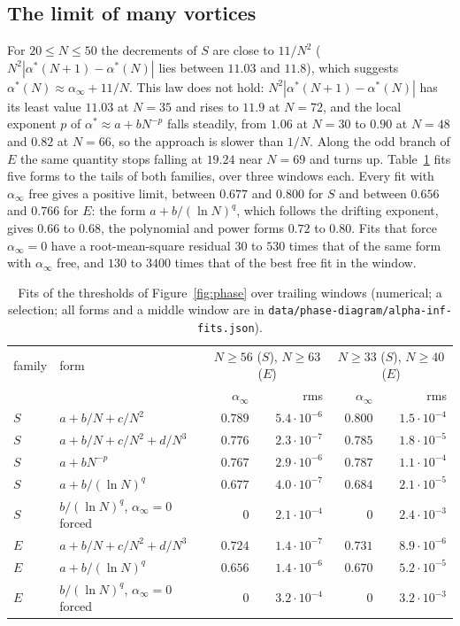 \documentclass[11pt]{article}
\theoremstyle{definition}
\begin{document}
\subsection{The limit of many vortices}

For $20 \le N \le 50$ the decrements of $S$ are close to $11/N^2$ ($N^2|\alpha^*(N + 1) - \alpha^*(N)|$ lies between $11.03$ and $11.8$), which suggests $\alpha^*(N) \approx \alpha_\infty + 11/N$. This law does not hold: $N^2|\alpha^*(N + 1) - \alpha^*(N)|$ has its least value $11.03$ at $N = 35$ and rises to $11.9$ at $N = 72$, and the local exponent $p$ of $\alpha^* \approx a + bN^{-p}$ falls steadily, from $1.06$ at $N = 30$ to $0.90$ at $N = 48$ and $0.82$ at $N = 66$, so the approach is slower than $1/N$. Along the odd branch of $E$ the same quantity stops falling at $19.24$ near $N = 69$ and turns up. Table~\ref{tab:fits} fits five forms to the tails of both families, over three windows each. Every fit with $\alpha_\infty$ free gives a positive limit, between $0.677$ and $0.800$ for $S$ and between $0.656$ and $0.766$ for $E$: the form $a + b/(\ln N)^q$, which follows the drifting exponent, gives $0.66$ to $0.68$, the polynomial and power forms $0.72$ to $0.80$. Fits that force $\alpha_\infty = 0$ have a root-mean-square residual $30$ to $530$ times that of the same form with $\alpha_\infty$ free, and $130$ to $3400$ times that of the best free fit in the window.

\begin{table}[t]
\centering
\small
\renewcommand{\arraystretch}{1.12}
\begin{tabular}{@{}llrrrr@{}}
\toprule
family & form & \multicolumn{2}{c}{$N \ge 56$ ($S$), $N \ge 63$ ($E$)} & \multicolumn{2}{c}{$N \ge 33$ ($S$), $N \ge 40$ ($E$)} \\
 & & $\alpha_\infty$ & rms & $\alpha_\infty$ & rms \\
\midrule
$S$ & $a + b/N + c/N^2$ & $0.789$ & $5.4 \cdot 10^{-6}$ & $0.800$ & $1.5 \cdot 10^{-4}$ \\
$S$ & $a + b/N + c/N^2 + d/N^3$ & $0.776$ & $2.3 \cdot 10^{-7}$ & $0.785$ & $1.8 \cdot 10^{-5}$ \\
$S$ & $a + bN^{-p}$ & $0.767$ & $2.9 \cdot 10^{-6}$ & $0.787$ & $1.1 \cdot 10^{-4}$ \\
$S$ & $a + b/(\ln N)^q$ & $0.677$ & $4.0 \cdot 10^{-7}$ & $0.684$ & $2.1 \cdot 10^{-5}$ \\
$S$ & $b/(\ln N)^q$, $\alpha_\infty = 0$ forced & $0$ & $2.1 \cdot 10^{-4}$ & $0$ & $2.4 \cdot 10^{-3}$ \\
$E$ & $a + b/N + c/N^2 + d/N^3$ & $0.724$ & $1.4 \cdot 10^{-7}$ & $0.731$ & $8.9 \cdot 10^{-6}$ \\
$E$ & $a + b/(\ln N)^q$ & $0.656$ & $1.4 \cdot 10^{-6}$ & $0.670$ & $5.2 \cdot 10^{-5}$ \\
$E$ & $b/(\ln N)^q$, $\alpha_\infty = 0$ forced & $0$ & $3.2 \cdot 10^{-4}$ & $0$ & $3.2 \cdot 10^{-3}$ \\
\bottomrule
\end{tabular}
\caption{Fits of the thresholds of Figure~\ref{fig:phase} over trailing windows (numerical; a selection; all forms and a middle window are in \texttt{data/phase-diagram/alpha-inf-fits.json}).}\label{tab:fits}
\end{table}
\end{document}

